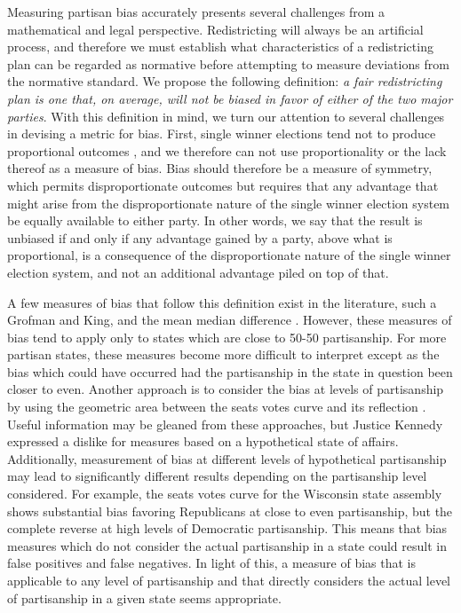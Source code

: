 \documentclass[preprint,12pt]{article}
\begin{document}
Measuring partisan bias accurately presents several challenges from a mathematical and legal perspective.
Redistricting will always be an artificial process, and therefore we must establish what characteristics of a redistricting plan can be regarded as normative before attempting to measure deviations from the normative standard.
We propose the following definition: \emph{a fair redistricting plan is one that, on average, will not be biased in favor of either of the two major parties}.
With this definition in mind, we turn our attention to several challenges in devising a metric for bias.
First, single winner elections tend not to produce proportional outcomes \cite{Kendall_1950_10.2307/588113}, and we therefore can not use proportionality or the lack thereof as a measure of bias.
Bias should therefore be a measure of symmetry, which permits disproportionate outcomes but requires that any advantage that might arise from the disproportionate nature of the single winner election system be equally available to either party.
In other words, we say that the result is unbiased if and only if any advantage gained by a party, above what is proportional, is a consequence of the disproportionate nature of the single winner election system, and not an additional advantage piled on top of that.

A few measures of bias that follow this definition exist in the literature, such a Grofman and King, and the mean median difference \cite{Grofman_2008_,Wang__,Wang_2016_10.1089/elj.2016.0387}.
However, these measures of bias tend to apply only to states which are close to 50-50 partisanship.
For more partisan states, these measures become more difficult to interpret except as the bias which could have occurred had the partisanship in the state in question been closer to even.
Another approach is to consider the bias at levels of partisanship by using the geometric area between the seats votes curve and its reflection \cite{Nagle_2015_10.1089/elj.2015.0311}.
Useful information may be gleaned from these approaches, but Justice Kennedy expressed a dislike for measures based on a hypothetical state of affairs.
Additionally, measurement of bias at different levels of hypothetical partisanship may lead to significantly different results depending on the partisanship level considered.
For example, the seats votes curve for the Wisconsin state assembly shows substantial bias favoring Republicans at close to even partisanship, but the complete reverse at high levels of Democratic partisanship.
This means that bias measures which do not consider the actual partisanship in a state could result in false positives and false negatives.
In light of this, a measure of bias that is applicable to any level of partisanship and that directly considers the actual level of partisanship in a given state seems appropriate.
\end{document}
